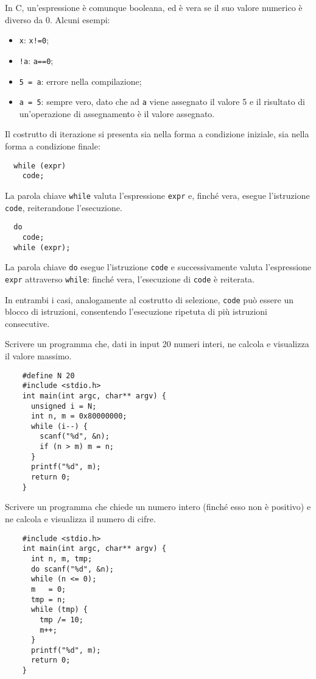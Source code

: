In C, un'espressione è comunque booleana, ed è vera se il suo valore numerico è diverso da 0.
Alcuni esempi:
\begin{itemize}
  \item \verb|x|: \verb|x!=0|;
  \item \verb|!a|: \verb|a==0|;
  \item \verb|5 = a|: errore nella compilazione;
  \item \verb|a = 5|: sempre vero, dato che ad \verb|a| viene assegnato il valore 5 e il risultato di un'operazione di assegnamento è il valore assegnato.
\end{itemize}

Il costrutto di iterazione si presenta sia nella forma a condizione iniziale, sia nella forma a condizione finale:
\begin{verbatim}
  while (expr)
    code;
\end{verbatim}
La parola chiave \verb|while| valuta l'espressione \verb|expr| e, finché vera, esegue l'istruzione \verb|code|, reiterandone l'esecuzione.
\begin{verbatim}
  do
    code;
  while (expr);
\end{verbatim}
La parola chiave \verb|do| esegue l'istruzione \verb|code| e successivamente valuta l'espressione \verb|expr| attraverso \verb|while|: finché vera, l'esecuzione di \verb|code| è reiterata.

In entrambi i casi, analogamente al costrutto di selezione, \verb|code| può essere un blocco di istruzioni, consentendo l'esecuzione ripetuta di più istruzioni consecutive.

\begin{example}
  Scrivere un programma che, dati in input 20 numeri interi, ne calcola e visualizza il valore massimo.
  \begin{verbatim}
    #define N 20
    #include <stdio.h>
    int main(int argc, char** argv) {
      unsigned i = N;
      int n, m = 0x80000000;
      while (i--) {
        scanf("%d", &n);
        if (n > m) m = n;
      }
      printf("%d", m);
      return 0;
    }\end{verbatim}
\end{example}

\begin{example}
  Scrivere un programma che chiede un numero intero (finché esso non è positivo) e ne calcola e visualizza il numero di cifre.
  \begin{verbatim}
    #include <stdio.h>
    int main(int argc, char** argv) {
      int n, m, tmp;
      do scanf("%d", &n);
      while (n <= 0);
      m   = 0;
      tmp = n;
      while (tmp) {
        tmp /= 10;
        m++;
      }
      printf("%d", m);
      return 0;
    }\end{verbatim}
\end{example}

